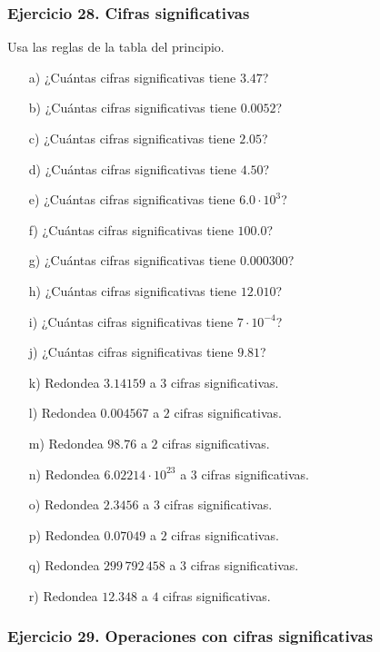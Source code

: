 \subsubsection*{Ejercicio 28. Cifras significativas}

Usa las reglas de la tabla del principio.

\begin{enumerate}
    \item[a)] ¿Cuántas cifras significativas tiene $3.47$?
    \item[b)] ¿Cuántas cifras significativas tiene $0.0052$?
    \item[c)] ¿Cuántas cifras significativas tiene $2.05$?
    \item[d)] ¿Cuántas cifras significativas tiene $4.50$?
    \item[e)] ¿Cuántas cifras significativas tiene $6.0\cdot10^3$?
    \item[f)] ¿Cuántas cifras significativas tiene $100.0$?
    \item[g)] ¿Cuántas cifras significativas tiene $0.000300$?
    \item[h)] ¿Cuántas cifras significativas tiene $12.010$?
    \item[i)] ¿Cuántas cifras significativas tiene $7\cdot10^{-4}$?
    \item[j)] ¿Cuántas cifras significativas tiene $9.81$?
    \item[k)] Redondea $3.14159$ a $3$ cifras significativas.
    \item[l)] Redondea $0.004567$ a $2$ cifras significativas.
    \item[m)] Redondea $98.76$ a $2$ cifras significativas.
    \item[n)] Redondea $6.02214\cdot10^{23}$
    a $3$ cifras significativas.
    \item[o)] Redondea $2.3456$ a $3$ cifras significativas.
    \item[p)] Redondea $0.07049$ a $2$ cifras significativas.
    \item[q)] Redondea $299\,792\,458$ a $3$ cifras significativas.
    \item[r)] Redondea $12.348$ a $4$ cifras significativas.
\end{enumerate}

\subsubsection*{Ejercicio 29. Operaciones con cifras significativas}

